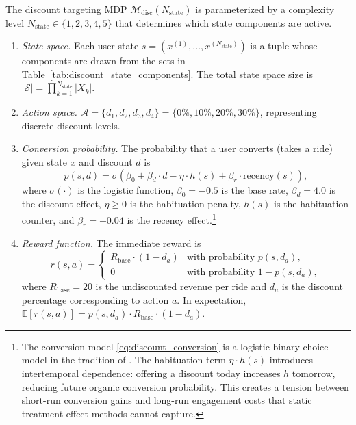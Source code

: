 \begin{definition}
\label{def:discount_mdp}
The discount targeting MDP $\mathcal{M}_{\mathrm{disc}}(N_{\mathrm{state}})$ is parameterized by a complexity level $N_{\mathrm{state}} \in \{1, 2, 3, 4, 5\}$ that determines which state components are active.

\begin{enumerate}
    \item \emph{State space.} Each user state $s = (x^{(1)}, \ldots, x^{(N_{\mathrm{state}})})$ is a tuple whose components are drawn from the sets in Table~\ref{tab:discount_state_components}. The total state space size is $|\mathcal{S}| = \prod_{k=1}^{N_{\mathrm{state}}} |X_k|$.

    \item \emph{Action space.} $\mathcal{A} = \{d_1, d_2, d_3, d_4\} = \{0\%, 10\%, 20\%, 30\%\}$, representing discrete discount levels.

    \item \emph{Conversion probability.} The probability that a user converts (takes a ride) given state $x$ and discount $d$ is
    \begin{equation}
    \label{eq:discount_conversion}
    p(s, d) = \sigma\!\left(\beta_0 + \beta_d \cdot d - \eta \cdot h(s) + \beta_r \cdot \mathrm{recency}(s)\right),
    \end{equation}
    where $\sigma(\cdot)$ is the logistic function, $\beta_0 = -0.5$ is the base rate, $\beta_d = 4.0$ is the discount effect, $\eta \geq 0$ is the habituation penalty, $h(s)$ is the habituation counter, and $\beta_r = -0.04$ is the recency effect.\footnote{The conversion model \eqref{eq:discount_conversion} is a logistic binary choice model in the tradition of \citet{mcfadden:1973}. The habituation term $\eta \cdot h(s)$ introduces intertemporal dependence: offering a discount today increases $h$ tomorrow, reducing future organic conversion probability. This creates a tension between short-run conversion gains and long-run engagement costs that static treatment effect methods cannot capture.}

    \item \emph{Reward function.} The immediate reward is
    \begin{equation}
    \label{eq:discount_reward}
    r(s, a) = \begin{cases} R_{\mathrm{base}} \cdot (1 - d_a) & \text{with probability } p(s, d_a), \\ 0 & \text{with probability } 1 - p(s, d_a), \end{cases}
    \end{equation}
    where $R_{\mathrm{base}} = 20$ is the undiscounted revenue per ride and $d_a$ is the discount percentage corresponding to action $a$. In expectation, $\mathbb{E}[r(s,a)] = p(s, d_a) \cdot R_{\mathrm{base}} \cdot (1 - d_a)$.


\end{enumerate}
\end{definition}
